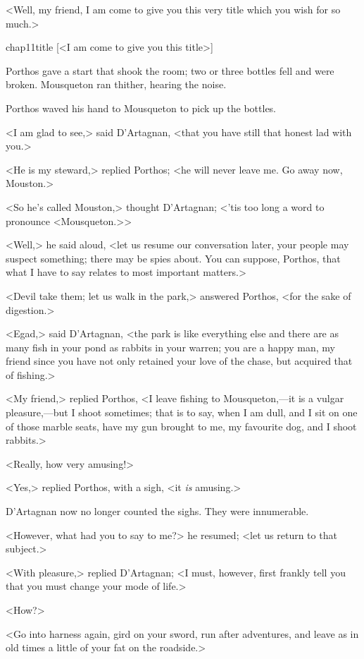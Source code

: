 <Well, my friend, I am come to give you this very title which you wish for so much.>

\begin{bwbigpic}
	[\basicscale] 
	{chap11title}
	[<I am come to give you this title>]
\end{bwbigpic}

Porthos gave a start that shook the room; two or three bottles fell and were broken. Mousqueton ran thither, hearing the noise.

Porthos waved his hand to Mousqueton to pick up the bottles.

<I am glad to see,> said D'Artagnan, <that you have still that honest lad with you.>

<He is my steward,> replied Porthos; <he will never leave me. Go away now, Mouston.>

<So he's called Mouston,> thought D'Artagnan; <'tis too long a word to pronounce <Mousqueton.>>

<Well,> he said aloud, <let us resume our conversation later, your people may suspect something; there may be spies about. You can suppose, Porthos, that what I have to say relates to most important matters.>

<Devil take them; let us walk in the park,> answered Porthos, <for the sake of digestion.>

<Egad,> said D'Artagnan, <the park is like everything else and there are as many fish in your pond as rabbits in your warren; you are a happy man, my friend since you have not only retained your love of the chase, but acquired that of fishing.>

<My friend,> replied Porthos, <I leave fishing to Mousqueton,—it is a vulgar pleasure,—but I shoot sometimes; that is to say, when I am dull, and I sit on one of those marble seats, have my gun brought to me, my favourite dog, and I shoot rabbits.>

<Really, how very amusing!>

<Yes,> replied Porthos, with a sigh, <it \textit{is} amusing.>

D'Artagnan now no longer counted the sighs. They were innumerable.

<However, what had you to say to me?> he resumed; <let us return to that subject.>

<With pleasure,> replied D'Artagnan; <I must, however, first frankly tell you that you must change your mode of life.>

<How?>

<Go into harness again, gird on your sword, run after adventures, and leave as in old times a little of your fat on the roadside.>

